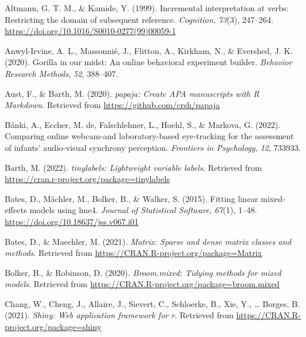 \documentclass[
  man,floatsintext]{apa6}
\newlength{\cslhangindent}
\newlength{\cslentryspacingunit} %
\newenvironment{CSLReferences}[2] %
 {%
  \setlength{\parindent}{0pt}
  \ifodd #1
  \let\oldpar\par
  \def\par{\hangindent=\cslhangindent\oldpar}
  \fi
  \setlength{\parskip}{#2\cslentryspacingunit}
 }%
 {}
\begin{document}
\hypertarget{refs}{}
\begin{CSLReferences}{1}{0}
\leavevmode{}%
Altmann, G. T. M., \& Kamide, Y. (1999). Incremental interpretation at verbs: Restricting the domain of subsequent reference. \emph{Cognition}, \emph{73}(3), 247--264. \url{https://doi.org/10.1016/S0010-0277(99)00059-1}

\leavevmode{}%
Anwyl-Irvine, A. L., Massonnié, J., Flitton, A., Kirkham, N., \& Evershed, J. K. (2020). Gorilla in our midst: An online behavioral experiment builder. \emph{Behavior Research Methods}, \emph{52}, 388--407.

\leavevmode{}%
Aust, F., \& Barth, M. (2020). \emph{{papaja}: {Create} {APA} manuscripts with {R Markdown}}. Retrieved from \url{https://github.com/crsh/papaja}

\leavevmode{}%
Bánki, A., Eccher, M. de, Falschlehner, L., Hoehl, S., \& Markova, G. (2022). Comparing online webcam-and laboratory-based eye-tracking for the assessment of infants' audio-visual synchrony perception. \emph{Frontiers in Psychology}, \emph{12}, 733933.

\leavevmode{}%
Barth, M. (2022). \emph{{tinylabels}: Lightweight variable labels}. Retrieved from \url{https://cran.r-project.org/package=tinylabels}

\leavevmode{}%
Bates, D., Mächler, M., Bolker, B., \& Walker, S. (2015). Fitting linear mixed-effects models using {lme4}. \emph{Journal of Statistical Software}, \emph{67}(1), 1--48. \url{https://doi.org/10.18637/jss.v067.i01}

\leavevmode{}%
Bates, D., \& Maechler, M. (2021). \emph{Matrix: Sparse and dense matrix classes and methods}. Retrieved from \url{https://CRAN.R-project.org/package=Matrix}

\leavevmode{}%
Bolker, B., \& Robinson, D. (2020). \emph{Broom.mixed: Tidying methods for mixed models}. Retrieved from \url{https://CRAN.R-project.org/package=broom.mixed}

\leavevmode{}%
Chang, W., Cheng, J., Allaire, J., Sievert, C., Schloerke, B., Xie, Y., \ldots{} Borges, B. (2021). \emph{Shiny: Web application framework for r}. Retrieved from \url{https://CRAN.R-project.org/package=shiny}


\end{CSLReferences}
\end{document}
